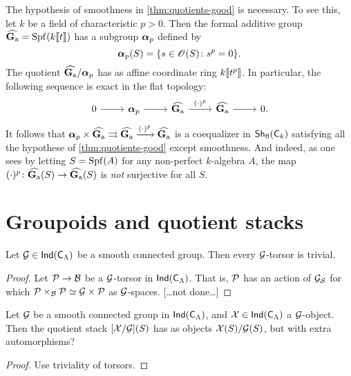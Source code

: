 \documentclass[phd,cornellheadings,draft]{cornell}
\begin{document}
\begin{example}
The hypothesis of smoothness in \ref{thm:quotients-good} is necessary. To see 
this, let $k$ be a field of characteristic $p>0$. Then the formal additive 
group $\widehat{\mathbf{G}_\mathrm{a}}=\operatorname{Spf}(k\llbracket t \rrbracket)$ has a subgroup ${\bm\alpha}_p$ defined by 
\[
  {\bm\alpha}_p(S) = \{s\in \mathscr{O}(S)\colon s^p=0\} .
\]
The quotient $\widehat{\mathbf{G}_\mathrm{a}}/{\bm\alpha}_p$ has as affine coordinate ring 
$k\llbracket t^p \rrbracket$. In particular, the following sequence is exact in the flat 
topology:
\[
\begin{tikzcd}
	0 \ar[r]
		& \balpha_p \ar[r]
		& \widehat\Ga \ar[r, "(\cdot)^p"]
		& \widehat\Ga \ar[r]
		& 0 .
\end{tikzcd}
\]
It follows that 
${\bm\alpha}_p\times \widehat{\mathbf{G}_\mathrm{a}}\rightrightarrows\widehat{\mathbf{G}_\mathrm{a}}\xrightarrow{(\cdot)^p} \widehat{\mathbf{G}_\mathrm{a}}$
is a coequalizer in $\operatorname{\mathsf{Sh}}_{\mathrm{fl}}(\mathsf{C}_k)$ satisfying all the hypothese 
of \ref{thm:quotients-good} except smoothness. And indeed, as one sees by 
letting $S=\operatorname{Spf}(A)$ for any non-perfect $k$-algebra $A$, the map 
$(\cdot)^p\colon \widehat{\mathbf{G}_\mathrm{a}}(S)\to \widehat{\mathbf{G}_\mathrm{a}}(S)$ is \emph{not} surjective for 
all $S$. 
\end{example}





\section{Groupoids and quotient stacks}

\begin{lemma}
Let $\mathcal{G}\in \operatorname{\mathsf{Ind}}(\mathsf{C}_\Lambda)$ be a smooth connected group. Then every 
$\mathcal{G}$-torsor is trivial. 
\end{lemma}
\begin{proof}
Let $\mathcal{P}\to \mathcal{B}$ be a $\mathcal{G}$-torsor in $\operatorname{\mathsf{Ind}}(\mathsf{C}_\Lambda)$. That is, $\mathcal{P}$ has 
an action of $\mathcal{G}_{\mathcal{S}}$ for which $\mathcal{P}\times_{\mathcal{B}}\mathcal{P}\simeq \mathcal{G}\times \mathcal{P}$ as 
$\mathcal{G}$-spaces. [\ldots not done\ldots]
\end{proof}

\begin{theorem}
Let $\mathcal{G}$ be a smooth connected group in $\operatorname{\mathsf{Ind}}(\mathsf{C}_\Lambda)$, and 
$\mathcal{X}\in \operatorname{\mathsf{Ind}}(\mathsf{C}_\Lambda)$ a $\mathcal{G}$-object. Then the quotient stack 
$[\mathcal{X}/\mathcal{G}](S)$ has as objects $\mathcal{X}(S)/\mathcal{G}(S)$, but with extra automorphisms? 
\end{theorem}
\begin{proof}
Use triviality of torsors. 
\end{proof}
\end{document}
